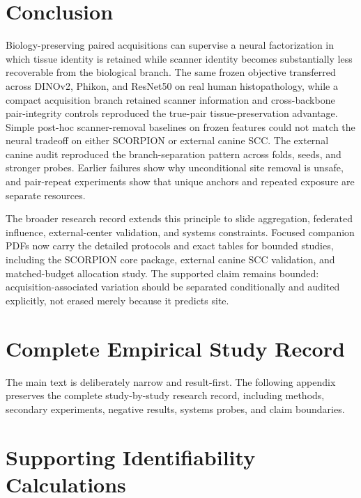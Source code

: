 \documentclass[10pt]{article}
\begin{document}
\section{Conclusion}
Biology-preserving paired acquisitions can supervise a neural factorization in which tissue identity is retained while scanner identity becomes substantially less recoverable from the biological branch. The same frozen objective transferred across DINOv2, Phikon, and ResNet50 on real human histopathology, while a compact acquisition branch retained scanner information and cross-backbone pair-integrity controls reproduced the true-pair tissue-preservation advantage. Simple post-hoc scanner-removal baselines on frozen features could not match the neural tradeoff on either SCORPION or external canine SCC. The external canine audit reproduced the branch-separation pattern across folds, seeds, and stronger probes. Earlier failures show why unconditional site removal is unsafe, and pair-repeat experiments show that unique anchors and repeated exposure are separate resources.

The broader research record extends this principle to slide aggregation, federated influence, external-center validation, and systems constraints. Focused companion PDFs now carry the detailed protocols and exact tables for bounded studies, including the SCORPION core package, external canine SCC validation, and matched-budget allocation study. The supported claim remains bounded: acquisition-associated variation should be separated conditionally and audited explicitly, not erased merely because it predicts site.

\appendix
\section{Complete Empirical Study Record}
The main text is deliberately narrow and result-first. The following appendix preserves the complete study-by-study research record, including methods, secondary experiments, negative results, systems probes, and claim boundaries.



\section{Supporting Identifiability Calculations}




\end{document}
